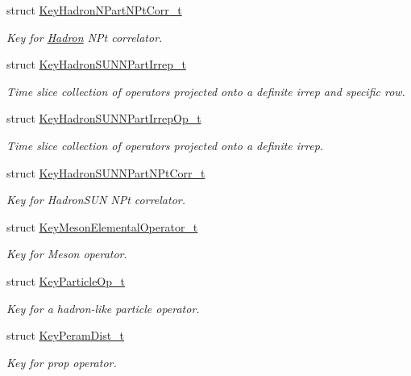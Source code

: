 \begin{DoxyCompactItemize}
struct \mbox{\hyperlink{structHadron_1_1KeyHadronNPartNPtCorr__t}{Key\+Hadron\+N\+Part\+N\+Pt\+Corr\+\_\+t}}
\begin{DoxyCompactList}\small\item\em Key for \mbox{\hyperlink{namespaceHadron}{Hadron}} N\+Pt correlator. \end{DoxyCompactList}\item 
struct \mbox{\hyperlink{structHadron_1_1KeyHadronSUNNPartIrrep__t}{Key\+Hadron\+S\+U\+N\+N\+Part\+Irrep\+\_\+t}}
\begin{DoxyCompactList}\small\item\em Time slice collection of operators projected onto a definite irrep and specific row. \end{DoxyCompactList}\item 
struct \mbox{\hyperlink{structHadron_1_1KeyHadronSUNNPartIrrepOp__t}{Key\+Hadron\+S\+U\+N\+N\+Part\+Irrep\+Op\+\_\+t}}
\begin{DoxyCompactList}\small\item\em Time slice collection of operators projected onto a definite irrep. \end{DoxyCompactList}\item 
struct \mbox{\hyperlink{structHadron_1_1KeyHadronSUNNPartNPtCorr__t}{Key\+Hadron\+S\+U\+N\+N\+Part\+N\+Pt\+Corr\+\_\+t}}
\begin{DoxyCompactList}\small\item\em Key for Hadron\+S\+UN N\+Pt correlator. \end{DoxyCompactList}\item 
struct \mbox{\hyperlink{structHadron_1_1KeyMesonElementalOperator__t}{Key\+Meson\+Elemental\+Operator\+\_\+t}}
\begin{DoxyCompactList}\small\item\em Key for Meson operator. \end{DoxyCompactList}\item 
struct \mbox{\hyperlink{structHadron_1_1KeyParticleOp__t}{Key\+Particle\+Op\+\_\+t}}
\begin{DoxyCompactList}\small\item\em Key for a hadron-\/like particle operator. \end{DoxyCompactList}\item 
struct \mbox{\hyperlink{structHadron_1_1KeyPeramDist__t}{Key\+Peram\+Dist\+\_\+t}}
\begin{DoxyCompactList}\small\item\em Key for prop operator. \end{DoxyCompactList}\item 

\end{DoxyCompactItemize}
